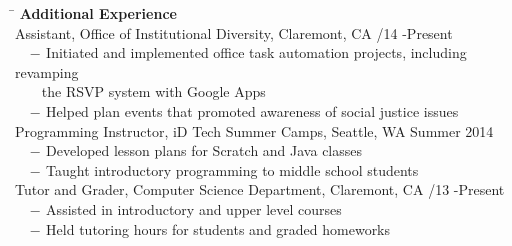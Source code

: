 \documentclass[12pt]{article}
\newcommand{\sectionNL}{\\[2pt]}
\newcommand{\customtab}{$\hspace{10pt} - \hspace{2pt}$}
\newcommand{\customtabinline}{$\hspace{23pt}$}
\begin{document}
\begin{tabbing} 
\hspace*{6.5in}\= \kill
{\textbf{Additional Experience } } \> \sectionNL
Assistant, Office of Institutional Diversity, Claremont, CA /14 -Present \\
\customtab Initiated and implemented office task automation projects, including revamping \\
\customtabinline the RSVP system with Google Apps \\
\customtab Helped plan events that promoted awareness of social justice issues \\

Programming Instructor, iD Tech Summer Camps, Seattle, WA \> Summer 2014 \\
\customtab Developed lesson plans for Scratch and Java classes \\
\customtab Taught introductory programming to  middle school students\\

Tutor and Grader, Computer Science Department, Claremont, CA /13 -Present \\ %
\customtab Assisted in introductory and upper level courses \\
\customtab Held tutoring hours for students and graded homeworks
\end{tabbing}
\end{document}
